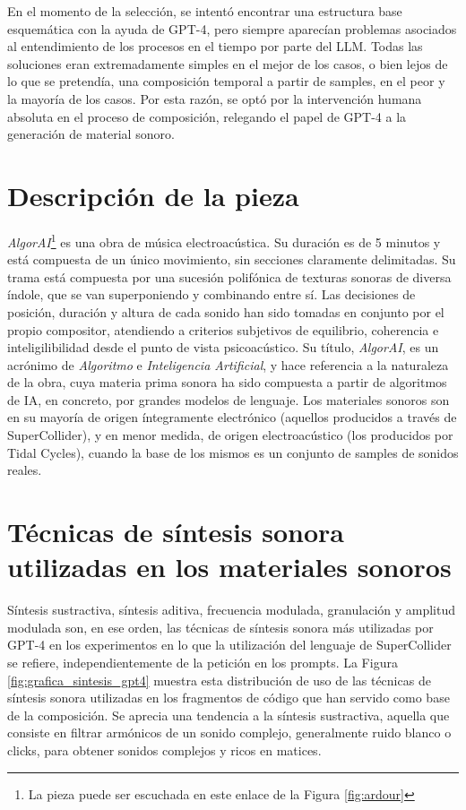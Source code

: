 En el momento de la selección, se intentó encontrar una estructura base esquemática con la ayuda de GPT-4, pero siempre aparecían problemas asociados al entendimiento de los procesos en el tiempo por parte del LLM. Todas las soluciones eran extremadamente simples en el mejor de los casos, o bien lejos de lo que se pretendía, una composición temporal a partir de samples, en el peor y la mayoría de los casos. Por esta razón, se optó por la intervención humana absoluta en el proceso de composición, relegando el papel de GPT-4 a la generación de material sonoro.

\section{Descripción de la pieza}

\textit{AlgorAI}\footnote{La pieza puede ser escuchada en este enlace de la Figura \ref{fig:ardour}} es una obra de música electroacústica. Su duración es de 5 minutos y está compuesta de un único movimiento, sin secciones claramente delimitadas. Su trama está compuesta por una sucesión polifónica de texturas sonoras de diversa índole, que se van superponiendo y combinando entre sí. Las decisiones de posición, duración y altura de cada sonido han sido tomadas en conjunto por el propio compositor, atendiendo a criterios subjetivos de equilibrio, coherencia e inteligilibilidad desde el punto de vista psicoacústico. Su título, \textit{AlgorAI}, es un acrónimo de \textit{Algoritmo} e \textit{Inteligencia Artificial}, y hace referencia a la naturaleza de la obra, cuya materia prima sonora ha sido compuesta a partir de algoritmos de IA, en concreto, por grandes modelos de lenguaje. Los materiales sonoros son en su mayoría de origen íntegramente electrónico (aquellos producidos a través de SuperCollider), y en menor medida, de origen electroacústico (los producidos por Tidal Cycles), cuando la base de los mismos es un conjunto de samples de sonidos reales.

\section{Técnicas de síntesis sonora utilizadas en los materiales sonoros}

Síntesis sustractiva, síntesis aditiva, frecuencia modulada, granulación y amplitud modulada son, en ese orden, las técnicas de síntesis sonora más utilizadas por GPT-4 en los experimentos en lo que la utilización del lenguaje de SuperCollider se refiere, independientemente de la petición en los prompts. La Figura \ref{fig:grafica_sintesis_gpt4} muestra esta distribución de uso de las técnicas de síntesis sonora utilizadas en los fragmentos de código que han servido como base de la composición. Se aprecia una tendencia a la síntesis sustractiva, aquella que consiste en filtrar armónicos de un sonido complejo, generalmente ruido blanco o clicks, para obtener sonidos complejos y ricos en matices.

